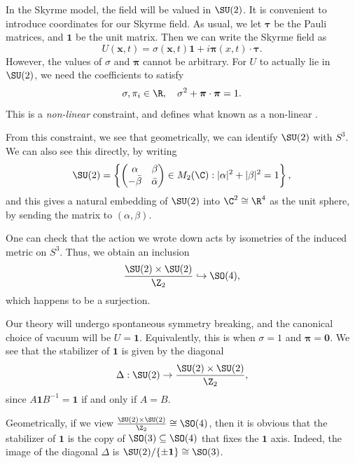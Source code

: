 \documentclass[a4paper]{article}
\begin{document}
In the Skyrme model, the field will be valued in $\SU(2)$. It is convenient to introduce coordinates for our Skyrme field. As usual, we let $\boldsymbol\tau$ be the Pauli matrices, and $\mathbf{1}$ be the unit matrix. Then we can write the Skyrme field as
\[
  U(\mathbf{x}, t) = \sigma(\mathbf{x}, t) \mathbf{1} + i \boldsymbol\pi(x, t) \cdot \boldsymbol\tau.
\]
However, the values of $\sigma$ and $\boldsymbol\pi$ cannot be arbitrary. For $U$ to actually lie in $\SU(2)$, we need the coefficients to satisfy
\[
  \sigma, \pi_i \in \R,\quad \sigma^2 + \boldsymbol\pi \cdot \boldsymbol\pi = 1.
\]
This is a \emph{non-linear} constraint, and defines what known as a non-linear .

From this constraint, we see that geometrically, we can identify $\SU(2)$ with $S^3$. We can also see this directly, by writing
\[
  \SU(2) =\left\{
  \begin{pmatrix}
    \alpha & \beta\\
    -\bar{\beta} & \bar{\alpha}
  \end{pmatrix} \in M_2(\C): |\alpha|^2 + |\beta|^2 = 1\right\},
\]
and this gives a natural embedding of $\SU(2)$ into $\C^2 \cong \R^4$ as the unit sphere, by sending the matrix to $(\alpha, \beta)$.

One can check that the action we wrote down acts by isometries of the induced metric on $S^3$. Thus, we obtain an inclusion
\[
  \frac{\SU(2) \times \SU(2)}{\Z_2} \hookrightarrow \SO(4),
\]
which happens to be a surjection.

Our theory will undergo spontaneous symmetry breaking, and the canonical choice of vacuum will be $U = \mathbf{1}$. Equivalently, this is when $\sigma = 1$ and $\boldsymbol\pi = \mathbf{0}$. We see that the stabilizer of $\mathbf{1}$ is given by the diagonal
\[
  \Delta : \SU(2) \rightarrow \frac{\SU(2) \times \SU(2)}{\Z_2},
\]
since $A\mathbf{1}B^{-1} = \mathbf{1}$ if and only if $A = B$.

Geometrically, if we view $\frac{\SU(2) \times \SU(2)}{\Z_2} \cong \SO(4)$, then it is obvious that the stabilizer of $\mathbf{1}$ is the copy of $\SO(3) \subseteq \SO(4)$ that fixes the $\mathbf{1}$ axis. Indeed, the image of the diagonal $\Delta$ is $\SU(2)/\{\pm \mathbf{1}\} \cong \SO(3)$.
\end{document}
